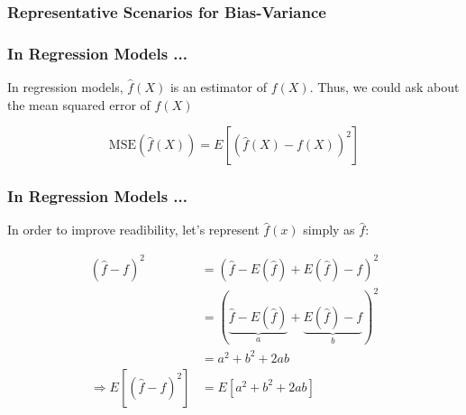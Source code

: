 \documentclass[12pt]{beamer}\usepackage[]{graphicx}\usepackage[]{color}
\begin{document}

\begin{frame}
\frametitle{Representative Scenarios for Bias-Variance}
\begin{center}
\end{center}
\end{frame}


\begin{frame}
\begin{center}
\Huge{}
\end{center}
\end{frame}


\begin{frame}
\frametitle{In Regression Models ...}

In regression models, $\hat{f}(X)$ is an estimator of $f(X)$.
Thus, we could ask about the mean squared error of $\hat{f}(X)$

$$
\text{MSE}(\hat{f}(X)) = E [(\hat{f}(X) - f(X))^2]
$$

\end{frame}


\begin{frame}
\frametitle{In Regression Models ...}

In order to improve readibility, let's represent $\hat{f}(x)$ simply as $\hat{f}$:

\begin{align*}
(\hat{f} - f)^2 &= (\hat{f} - E(\hat{f}) + E(\hat{f}) - f)^2 \\
&= (\underbrace{\hat{f} - E(\hat{f})}_{a} + \underbrace{E(\hat{f}) - f}_{b})^2 \\
&= a^2 + b^2 + 2ab \\
\Longrightarrow E \left [ (\hat{f} - f)^2 \right ] &= E[a^2 + b^2 + 2ab]
\end{align*}

\end{frame}

\end{document}
